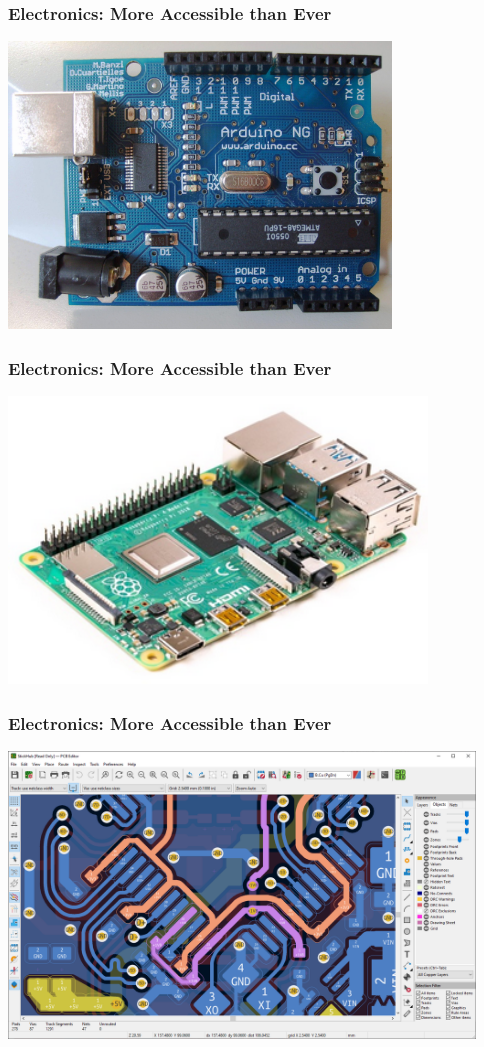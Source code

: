 \documentclass{presentation}
\begin{document}
\begin{frame}\frametitle{Electronics: More Accessible than Ever}
  \centering
  \includegraphics[height=3in]{"./Arduino_top-1.jpg"}
\end{frame}

\begin{frame}\frametitle{Electronics: More Accessible than Ever}
  \centering
  \includegraphics[height=3in]{"./Raspberry_Pi_4_B.png"}
\end{frame}

\begin{frame}\frametitle{Electronics: More Accessible than Ever}
  \centering
  \includegraphics[height=3in]{"./pcb_editor.png"}
\end{frame}
\end{document}
